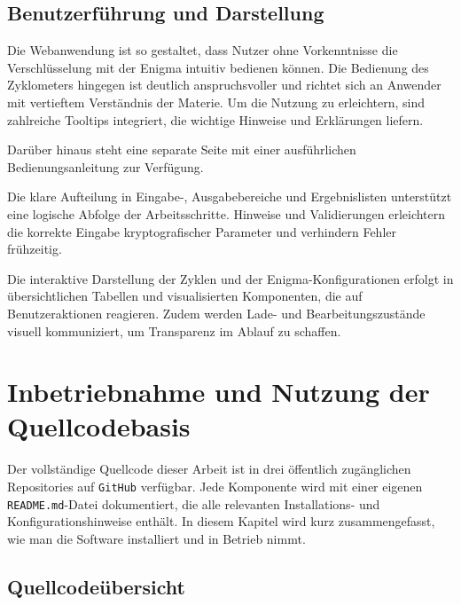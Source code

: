 \documentclass[12pt, ngerman, a4paper, numbers=noenddot]{article}
\begin{document}
\subsection{Benutzerführung und Darstellung}

Die Webanwendung ist so gestaltet, dass Nutzer ohne Vorkenntnisse die Verschlüsselung mit der Enigma intuitiv bedienen können. Die Bedienung des Zyklometers hingegen ist deutlich anspruchsvoller und richtet sich an Anwender mit vertieftem Verständnis der Materie. Um die Nutzung zu erleichtern, sind zahlreiche Tooltips integriert, die wichtige Hinweise und Erklärungen liefern.

Darüber hinaus steht eine separate Seite mit einer ausführlichen Bedienungsanleitung zur Verfügung.

Die klare Aufteilung in Eingabe-, Ausgabebereiche und Ergebnislisten unterstützt eine logische Abfolge der Arbeitsschritte. Hinweise und Validierungen erleichtern die korrekte Eingabe kryptografischer Parameter und verhindern Fehler frühzeitig.

Die interaktive Darstellung der Zyklen und der Enigma-Konfigurationen erfolgt in übersichtlichen Tabellen und visualisierten Komponenten, die auf Benutzeraktionen reagieren. Zudem werden Lade- und Bearbeitungszustände visuell kommuniziert, um Transparenz im Ablauf zu schaffen.


\newpage
\section{Inbetriebnahme und Nutzung der Quellcodebasis}
\label{sec:nutzung}

Der vollständige Quellcode dieser Arbeit ist in drei öffentlich zugänglichen Repositories auf \lstinline|GitHub| verfügbar. Jede Komponente wird mit einer eigenen \lstinline|README.md|-Datei dokumentiert, die alle relevanten Installations- und Konfigurationshinweise enthält. In diesem Kapitel wird kurz zusammengefasst, wie man die Software installiert und in Betrieb nimmt.

\subsection{Quellcodeübersicht}
\end{document}
